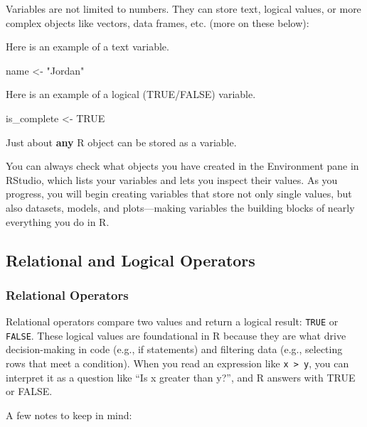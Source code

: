 \documentclass[
  11pt,
]{article}
\newenvironment{Shaded}{\begin{snugshade}}{\end{snugshade}}
\newcommand{\ConstantTok}[1]{\textcolor[rgb]{0.56,0.35,0.01}{#1}}
\newcommand{\NormalTok}[1]{#1}
\newcommand{\OtherTok}[1]{\textcolor[rgb]{0.56,0.35,0.01}{#1}}
\newcommand{\StringTok}[1]{\textcolor[rgb]{0.31,0.60,0.02}{#1}}
\begin{document}
Variables are not limited to numbers. They can store text, logical
values, or more complex objects like vectors, data frames, etc. (more on
these below):

Here is an example of a text variable.

\begin{Shaded}
\begin{Highlighting}[]
\NormalTok{name }\OtherTok{\textless{}{-}} \StringTok{"Jordan"}
\end{Highlighting}
\end{Shaded}

Here is an example of a logical (TRUE/FALSE) variable.

\begin{Shaded}
\begin{Highlighting}[]
\NormalTok{is\_complete }\OtherTok{\textless{}{-}} \ConstantTok{TRUE}
\end{Highlighting}
\end{Shaded}

Just about \textbf{any} R object can be stored as a variable.

You can always check what objects you have created in the Environment
pane in RStudio, which lists your variables and lets you inspect their
values. As you progress, you will begin creating variables that store
not only single values, but also datasets, models, and plots---making
variables the building blocks of nearly everything you do in R.

\subsection{Relational and Logical
Operators}\label{relational-and-logical-operators}

\subsubsection{Relational Operators}\label{relational-operators}

Relational operators compare two values and return a logical result:
\texttt{TRUE} or \texttt{FALSE}. These logical values are foundational
in R because they are what drive decision-making in code (e.g., if
statements) and filtering data (e.g., selecting rows that meet a
condition). When you read an expression like
\texttt{x\ \textgreater{}\ y}, you can interpret it as a question like
``Is x greater than y?'', and R answers with TRUE or FALSE.

A few notes to keep in mind:
\end{document}
